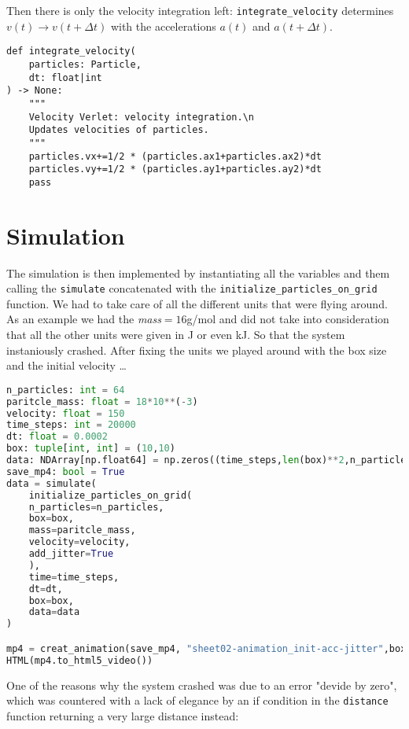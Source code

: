 \documentclass{article}
\begin{document}
Then there is only the velocity integration left: \texttt{integrate\_velocity} determines $v(t) \to v(t+\Delta t)$ with the accelerations $a(t)$ and $a(t+\Delta t)$.
\begin{lstlisting}
def integrate_velocity(
    particles: Particle,
    dt: float|int
) -> None:
    """
    Velocity Verlet: velocity integration.\n
    Updates velocities of particles.
    """
    particles.vx+=1/2 * (particles.ax1+particles.ax2)*dt
    particles.vy+=1/2 * (particles.ay1+particles.ay2)*dt
    pass
\end{lstlisting}


\section{Simulation}

The simulation is then implemented by instantiating all the variables and them calling the \texttt{simulate} concatenated with the \texttt{initialize\_particles\_on\_grid} function. We had to take care of all the different units that were flying around. As an example we had the \textit{mass}$=16$g/mol and did not take into consideration that all the other units were given in J or even kJ. So that the system instaniously crashed. After fixing the units we played around with the box size and the initial velocity \dots 

\begin{lstlisting}[language=Python, caption=Simulation run.]
n_particles: int = 64  
paritcle_mass: float = 18*10**(-3)  
velocity: float = 150 
time_steps: int = 20000
dt: float = 0.0002  
box: tuple[int, int] = (10,10)  
data: NDArray[np.float64] = np.zeros((time_steps,len(box)**2,n_particles)) 
save_mp4: bool = True
data = simulate(
    initialize_particles_on_grid(
    n_particles=n_particles,
    box=box,
    mass=paritcle_mass,  
    velocity=velocity,
    add_jitter=True  
    ),
    time=time_steps, 
    dt=dt,  
    box=box,
    data=data  
)

mp4 = creat_animation(save_mp4, "sheet02-animation_init-acc-jitter",box, data[:,0,:],data[:,1,:])  
HTML(mp4.to_html5_video())   
\end{lstlisting} 
One of the reasons why the system crashed was due to an error  "devide by zero", which was countered with a lack of elegance by an if condition in the \texttt{distance} function returning a very large distance instead:
\end{document}
